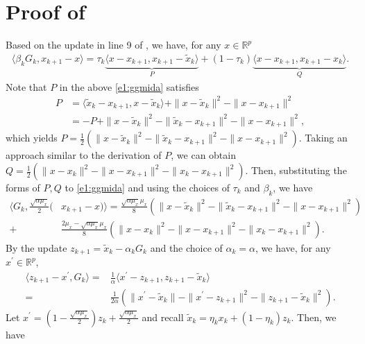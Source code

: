 \documentclass{osudissert96}
\begin{document}
\section{Proof of }\label{proof:upss_wb}
Based on the update in line 9 of , we  have,  for any $x\in\mathbb{R}^p$
\begin{align}\label{e1:ggmida}
\langle \beta_k G_k,x_{k+1}-x\rangle = \tau_k\underbrace{\langle x-x_{k+1}, x_{k+1} -\widetilde x_k\rangle}_{P} + (1-\tau_k)\underbrace{\langle x-x_{k+1},x_{k+1}-x_k\rangle}_{Q}.
\end{align}
Note that $P$ in the above \cref{e1:ggmida} satisfies 
\begin{align*}
P &= \langle \widetilde x_k - x_{k+1}, x -\widetilde x_k \rangle + \|x-\widetilde x_k\|^2 - \|x-x_{k+1}\|^2
\\&=-P + \|x-\widetilde x_k\|^2 -\|\widetilde x_k-x_{k+1}\|^2 -\|x-x_{k+1}\|^2,
\end{align*}
which yields $P =\frac{1}{2}(\|x-\widetilde x_k\|^2 -\|\widetilde x_k-x_{k+1}\|^2 -\|x-x_{k+1}\|^2)$. Taking an approach similar to the derivation of $P$, we can obtain $Q=\frac{1}{2}(\|x- x_k\|^2 -\| x-x_{k+1}\|^2 -\|x_{k}-x_{k+1}\|^2)$. Then,  substituting  the forms of $P,Q$ to \cref{e1:ggmida} and using the choices of $\tau_k$ and $\beta_k$, we have 
\begin{align}\label{eq:gdangle}
\big\langle G_k, \frac{\sqrt{\alpha\mu_x}}{2}(&x_{k+1}-x)\big\rangle =  \frac{\sqrt{\alpha\mu_x}\mu_x}{8} (\|x-\widetilde x_k\|^2 -\|\widetilde x_k-x_{k+1}\|^2 -\|x-x_{k+1}\|^2)  \nonumber
\\+&\frac{2\mu_x-\sqrt{\alpha\mu_x}\mu_x}{8}(\|x- x_k\|^2 -\| x-x_{k+1}\|^2 -\|x_{k}-x_{k+1}\|^2).
\end{align}
By the update $z_{k+1}= \widetilde x_k -\alpha_k G_k $ and the choice of $\alpha_k=\alpha$, we have, for any $x^\prime\in\mathbb{R}^p$,
\begin{align}\label{eq:changeone}
\langle z_{k+1}-x^\prime, G_k \rangle  =& \frac{1}{\alpha}\langle x^\prime-z_{k+1}, z_{k+1}-\widetilde x_k \rangle \nonumber
\\ = & \frac{1}{2\alpha} (\|x^\prime-\widetilde x_k\| - \|x^\prime-z_{k+1}\|^2 - \|z_{k+1}-\widetilde x_k\|^2).
\end{align}
Let  $x^{\prime} = (1-\frac{\sqrt{\alpha\mu_x}}{2})z_k + \frac{\sqrt{\alpha \mu_x}}{2}$ and recall $\widetilde x_k = \eta_kx_k + (1-\eta_k)z_k$. Then, we have
\end{document}
